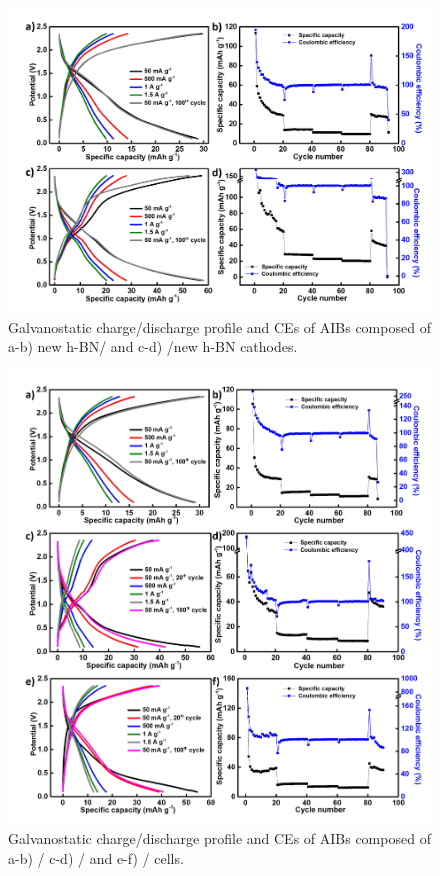 \begin{figure}[tbh!]
\centering
\includegraphics[width=\textwidth]{Figures/BOhBN/BNdifO}
\caption{Galvanostatic charge/discharge profile and CEs of AIBs composed of a-b) new h-BN/ and c-d) /new h-BN cathodes.}
\label{Figures/BOhBN:BNdifO}
\end{figure}

\begin{figure}[tbh!]
\centering
\includegraphics[width=\textwidth]{Figures/BOhBN/othON}
\caption{Galvanostatic charge/discharge profile and CEs of AIBs composed of a-b) / c-d) / and e-f) / cells.}
\label{Figures/BOhBN:othON}
\end{figure}

